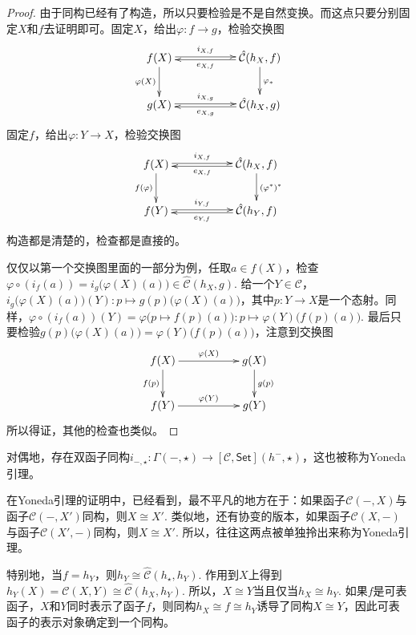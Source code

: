 \begin{proof}
	由于同构已经有了构造，所以只要检验是不是自然变换。而这点只要分别固定$X$和$f$去证明即可。固定$X$，给出$\varphi:f\to g$，检验交换图
	\[
	\begin{xy}
		\xymatrix{
			f(X)\ar@<0.3ex>[rr]^-{i_{X,f}} \ar[d]_{\varphi(X)}&&{\hat{\mathcal{C}}}(h_X,f) \ar[d]^{\varphi_*}\ar@<0.3ex>[ll]^-{e_{X,f}}\\
			g(X)\ar@<0.3ex>[rr]^-{i_{X,g}}&&{\hat{\mathcal{C}}}(h_X,g)\ar@<0.3ex>[ll]^-{e_{X,g}}
		}
	\end{xy}
	\]
	固定$f$，给出$\varphi:Y\to X$，检验交换图
	\[
	\begin{xy}
		\xymatrix{
			f(X)\ar@<0.3ex>[rr]^-{i_{X,f}} \ar[d]_{f(\varphi)}&&{\hat{\mathcal{C}}}(h_X,f) \ar[d]^{(\varphi^*)^*}\ar@<0.3ex>[ll]^-{e_{X,f}}\\
			f(Y)\ar@<0.3ex>[rr]^-{i_{Y,f}}&&{\hat{\mathcal{C}}}(h_Y,f)\ar@<0.3ex>[ll]^-{e_{Y,f}}
		}
	\end{xy}
	\]
	构造都是清楚的，检查都是直接的。
	
	仅仅以第一个交换图里面的一部分为例，任取$a\in f(X)$，检查$\varphi\circ (i_f(a))=i_g\bigl(\varphi(X)(a)\bigr)\in {\hat{\mathcal{C}}}(h_X,g)$. 给一个$Y\in \mathcal{C}$，$i_g\bigl(\varphi(X)(a)\bigr)(Y):p\mapsto g(p)\bigl (\varphi(X)(a)\bigr)$，其中$p:Y\to X$是一个态射。同样，$\varphi\circ (i_f(a))(Y)=\varphi\bigl(p\mapsto f(p)(a)\bigr):p\mapsto \varphi(Y)\bigl(f(p)(a)\bigr)$. 最后只要检验$g(p)\bigl (\varphi(X)(a)\bigr)=\varphi(Y)\bigl(f(p)(a)\bigr)$，注意到交换图
	\[
	\begin{xy}
		\xymatrix{
			f(X)\ar[rr]^{\varphi(X)} \ar[d]_{f(p)}&&g(X) \ar[d]^{g(p)}\\
			f(Y)\ar[rr]^{\varphi(Y)}&&g(Y)
		}
	\end{xy}
	\]
	所以得证，其他的检查也类似。
\end{proof}

\begin{pro}
对偶地，存在双函子同构$i_{-,\star}:\Gamma(-,\star)\to [\mathcal{C},\mathsf{Set}](h^-,\star)$，这也被称为Yoneda引理。
\end{pro}

在Yoneda引理的证明中，已经看到，最不平凡的地方在于：如果函子$\mathcal{C}(-,X)$与函子$\mathcal{C}(-,X')$同构，则$X\cong X'$. 类似地，还有协变的版本，如果函子$\mathcal{C}(X,-)$与函子$\mathcal{C}(X',-)$同构，则$X\cong X'$. 所以，往往这两点被单独拎出来称为Yoneda引理。

\para 特别地，当$f=h_Y$，则$h_Y\cong {\hat{\mathcal{C}}}(h_\star,h_Y)$. 作用到$X$上得到$h_Y(X)={\mathcal{C}}(X,Y)\cong {\hat{\mathcal{C}}}(h_X,h_Y)$. 所以，$X\cong Y$当且仅当$h_X\cong h_Y$. 如果$f$是可表函子，$X$和$Y$同时表示了函子$f$，则同构$h_X\cong f \cong h_Y$诱导了同构$X\cong Y$，因此可表函子的表示对象确定到一个同构。 

